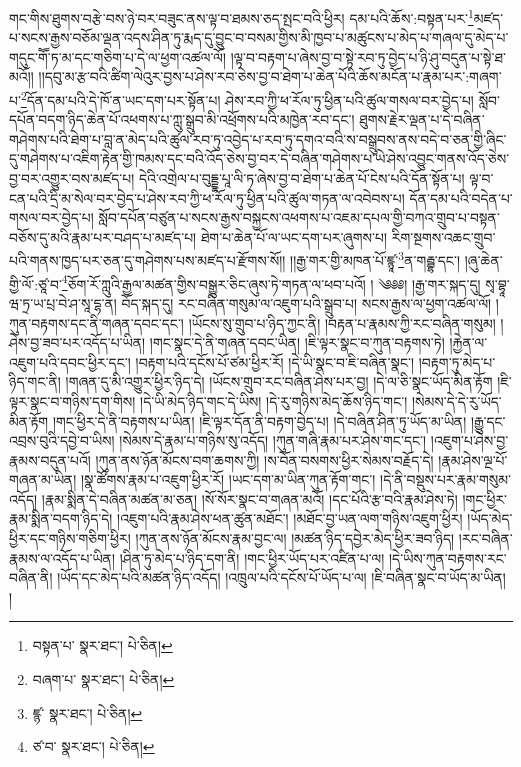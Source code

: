 གང་གིས་ཐུགས་བརྩེ་བས་ཉེ་བར་བཟུང་ནས་ལྟ་བ་ཐམས་ཅད་སྤང་བའི་ཕྱིར། དམ་པའི་ཆོས་:བསྟན་པར་\footnote{བསྟན་པ་  སྣར་ཐང་།  པེ་ཅིན། }མཛད་པ་སངས་རྒྱས་བཅོམ་ལྡན་འདས་ཤིན་ཏུ་རྨད་དུ་བྱུང་བ་བསམ་གྱིས་མི་ཁྱབ་པ་མཚུངས་པ་མེད་པ་གཞལ་དུ་མེད་པ་གདུང་གཽ་ཏ་མ་དང་གཅིག་པ་དེ་ལ་ཕྱག་འཚལ་ལོ། །ལྟ་བ་བརྟག་པ་ཞེས་བྱ་བ་སྟེ་རབ་ཏུ་བྱེད་པ་ཉི་ཤུ་བདུན་པ་སྟེ་ཐ་མའོ།། །།དབུ་མ་རྩ་བའི་ཚིག་ལེའུར་བྱས་པ་ཤེས་རབ་ཅེས་བྱ་བ་ཐེག་པ་ཆེན་པོའི་ཆོས་མངོན་པ་རྣམ་པར་:གཞག་པ་\footnote{བཞག་པ་  སྣར་ཐང་།  པེ་ཅིན། }དོན་དམ་པའི་དེ་ཁོ་ན་ཡང་དག་པར་སྟོན་པ། ཤེས་རབ་ཀྱི་ཕ་རོལ་ཏུ་ཕྱིན་པའི་ཚུལ་གསལ་བར་བྱེད་པ། སློབ་དཔོན་བདག་ཉིད་ཆེན་པོ་འཕགས་པ་ཀླུ་སྒྲུབ་མི་འཕྲོགས་པའི་མཁྱེན་རབ་དང་། ཐུགས་རྗེར་ལྡན་པ་དེ་བཞིན་གཤེགས་པའི་ཐེག་པ་བླ་ན་མེད་པའི་ཚུལ་རབ་ཏུ་འབྱེད་པ་རབ་ཏུ་དགའ་བའི་ས་བསྒྲུབས་ནས་བདེ་བ་ཅན་གྱི་ཞིང་དུ་གཤེགས་པ་འཇིག་རྟེན་གྱི་ཁམས་དང་བའི་འོད་ཅེས་བྱ་བར་དེ་བཞིན་གཤེགས་པ་ཡེ་ཤེས་འབྱུང་གནས་འོད་ཅེས་བྱ་བར་འགྱུར་བས་མཛད་པ། དེའི་འགྲེལ་པ་བུདྡྷ་པཱ་ལི་ཏ་ཞེས་བྱ་བ་ཐེག་པ་ཆེན་པོ་ངེས་པའི་དོན་སྟོན་པ། ལྟ་བ་ངན་པའི་དྲི་མ་སེལ་བར་བྱེད་པ་ཤེས་རབ་ཀྱི་ཕ་རོལ་ཏུ་ཕྱིན་པའི་ཚུལ་གཏན་ལ་འབེབས་པ། དོན་དམ་པའི་བདེན་པ་གསལ་བར་བྱེད་པ། སློབ་དཔོན་བཙུན་པ་སངས་རྒྱས་བསྐྱངས་འཕགས་པ་འཇམ་དཔལ་གྱི་བཀའ་གྲུབ་པ་བསྟན་བཅོས་དུ་མའི་རྣམ་པར་བཤད་པ་མཛད་པ། ཐེག་པ་ཆེན་པོ་ལ་ཡང་དག་པར་ཞུགས་པ། རིག་སྔགས་འཆང་གྲུབ་པའི་གནས་ཁྱད་པར་ཅན་དུ་གཤེགས་པས་མཛད་པ་རྫོགས་སོ།། །།རྒྱ་གར་གྱི་མཁན་པོ་ཛྙཱ་\footnote{ཛྙ་  སྣར་ཐང་།  པེ་ཅིན། }ན་གརྦྷ་དང་། །ཞུ་ཆེན་གྱི་ལོ་:ཙཱ་བ་\footnote{ཙ་བ་  སྣར་ཐང་།  པེ་ཅིན། }ཅོག་རོ་ཀླུའི་རྒྱལ་མཚན་གྱིས་བསྒྱུར་ཅིང་ཞུས་ཏེ་གཏན་ལ་ཕབ་པའོ། ། ༄༅༅། །རྒྱ་གར་སྐད་དུ། སྭ་བྷཱ་ཝ་ཏྲ་ཡ་པྲ་བེ་ཤ་སཱ་དྷ་ན། བོད་སྐད་དུ། རང་བཞིན་གསུམ་ལ་འཇུག་པའི་སྒྲུབ་པ། སངས་རྒྱས་ལ་ཕྱག་འཚལ་ལོ། །ཀུན་བརྟགས་དང་ནི་གཞན་དབང་དང་། །ཡོངས་སུ་གྲུབ་པ་ཉིད་ཀྱང་ནི། །བརྟན་པ་རྣམས་ཀྱི་རང་བཞིན་གསུམ། །ཤེས་བྱ་ཟབ་པར་འདོད་པ་ཡིན། །གང་སྣང་དེ་ནི་གཞན་དབང་ཡིན། །ཇི་ལྟར་སྣང་བ་ཀུན་བརྟགས་ཏེ། །རྐྱེན་ལ་འཇུག་པའི་དབང་ཕྱིར་དང་། །བརྟག་པའི་དངོས་པོ་ཙམ་ཕྱིར་རོ། །དེ་ཡི་སྣང་བ་ཇི་བཞིན་སྣང་། །བརྟག་ཏུ་མེད་པ་ཉིད་གང་ནི། །གཞན་དུ་མི་འགྱུར་ཕྱིར་ཉིད་དེ། །ཡོངས་གྲུབ་རང་བཞིན་ཤེས་པར་བྱ། །དེ་ལ་ཅི་སྣང་ཡོད་མིན་རྟོག །ཇི་ལྟར་སྣང་བ་གཉིས་དག་གིས། །དེ་ཡི་མེད་ཉིད་གང་དེ་ཡིས། །དེ་རུ་གཉིས་མེད་ཆོས་ཉིད་གང་། །སེམས་དེ་དེ་རུ་ཡོད་མིན་རྟོག །གང་ཕྱིར་དེ་ནི་བརྟགས་པ་ཡིན། །ཇི་ལྟར་དོན་ནི་བརྟག་བྱེད་པ། །དེ་བཞིན་ཤིན་ཏུ་ཡོད་མ་ཡིན། །རྒྱུ་དང་འབྲས་བུའི་དབྱེ་བ་ཡིས། །སེམས་དེ་རྣམ་པ་གཉིས་སུ་འདོད། །ཀུན་གཞི་རྣམ་པར་ཤེས་གང་དང་། །འཇུག་པ་ཤེས་བྱ་རྣམས་བདུན་པའོ། །ཀུན་ནས་ཉོན་མོངས་བག་ཆགས་ཀྱི། །ས་བོན་བསགས་ཕྱིར་སེམས་བརྗོད་དེ། །རྣམ་ཤེས་ལྔ་པོ་གཞན་མ་ཡིན། །སྣ་ཚོགས་རྣམ་པ་འཇུག་ཕྱིར་རོ། །ཡང་དག་མ་ཡིན་ཀུན་རྟོག་གང་། །དེ་ནི་བསྡུས་པར་རྣམ་གསུམ་འདོད། །རྣམ་སྨིན་དེ་བཞིན་མཚན་མ་ཅན། །སོ་སོར་སྣང་བ་གཞན་མའོ། །དང་པོའི་རྩ་བའི་རྣམ་ཤེས་ཏེ། །གང་ཕྱིར་རྣམ་སྨིན་བདག་ཉིད་དེ། །འཇུག་པའི་རྣམ་ཤེས་ཕན་ཚུན་མཐོང་། །མཐོང་བྱ་ཡན་ལག་གཉིས་འཇུག་ཕྱིར། །ཡོད་མེད་ཕྱིར་དང་གཉིས་གཅིག་ཕྱིར། །ཀུན་ནས་ཉོན་མོངས་རྣམ་བྱང་ལ། །མཚན་ཉིད་དབྱེར་མེད་ཕྱིར་ཟབ་ཉིད། །རང་བཞིན་རྣམས་ལ་འདོད་པ་ཡིན། །ཤིན་ཏུ་མེད་པ་ཉིད་དག་ནི། །གང་ཕྱིར་ཡོད་པར་འཛིན་པ་ལ། །དེ་ཡིས་ཀུན་བརྟགས་རང་བཞིན་ནི། །ཡོད་དང་མེད་པའི་མཚན་ཉིད་འདོད། །འཁྲུལ་པའི་དངོས་པོ་ཡོད་པ་ལ། །ཇི་བཞིན་སྣང་བ་ཡོད་མ་ཡིན། །
